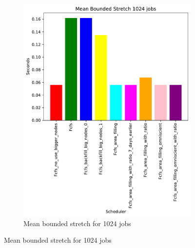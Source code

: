 \documentclass[a4paper]{article}
\begin{document}
\begin{figure}[H]
\begin{subfigure}[b]{0.4\linewidth}\centering\includegraphics[width=0.95\linewidth]{MBSS/plot/Size_Constraint_2022-01-17->2022-01-17_V9271_Mean_Stretch_With_a_Minimum_1024_450_128_32_256_4_1024.pdf}\caption{Mean bounded stretch for 1024 jobs}\label{45}\end{subfigure}

\end{figure}
\end{document}
